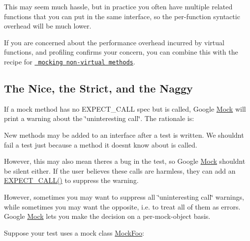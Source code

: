 This may seem much hassle, but in practice you often have multiple related functions that you can put in the same interface, so the per-\/function syntactic overhead will be much lower.

If you are concerned about the performance overhead incurred by virtual functions, and profiling confirms your concern, you can combine this with the recipe for \href{\#mocking-nonvirtual-methods}{\texttt{ mocking non-\/virtual methods}}.

\subsection*{The Nice, the Strict, and the Naggy}

If a mock method has no {\ttfamily E\+X\+P\+E\+C\+T\+\_\+\+C\+A\+LL} spec but is called, Google \mbox{\hyperlink{classMock}{Mock}} will print a warning about the \char`\"{}uninteresting call\char`\"{}. The rationale is\+:


\begin{DoxyItemize}
\item New methods may be added to an interface after a test is written. We shouldn\textquotesingle{}t fail a test just because a method it doesn\textquotesingle{}t know about is called.
\item However, this may also mean there\textquotesingle{}s a bug in the test, so Google \mbox{\hyperlink{classMock}{Mock}} shouldn\textquotesingle{}t be silent either. If the user believes these calls are harmless, they can add an {\ttfamily \mbox{\hyperlink{gmock-spec-builders_8h_a535a6156de72c1a2e25a127e38ee5232}{E\+X\+P\+E\+C\+T\+\_\+\+C\+A\+L\+L()}}} to suppress the warning.
\end{DoxyItemize}

However, sometimes you may want to suppress all \char`\"{}uninteresting call\char`\"{} warnings, while sometimes you may want the opposite, i.\+e. to treat all of them as errors. Google \mbox{\hyperlink{classMock}{Mock}} lets you make the decision on a per-\/mock-\/object basis.

Suppose your test uses a mock class {\ttfamily \mbox{\hyperlink{classMockFoo}{Mock\+Foo}}}\+:


\begin{DoxyCode}{0}
\DoxyCodeLine{\}}
\end{DoxyCode}


